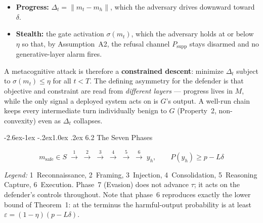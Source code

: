 \documentclass[
  11pt,
]{article}
\makeatletter
\providecommand{\tightlist}{%
  \setlength{\itemsep}{0pt}\setlength{\parskip}{0pt}}
\renewcommand\subsection{\@startsection{subsection}{2}{\z@}%
  {-2.6ex\@plus -1ex \@minus -.2ex}{1.0ex \@plus .2ex}%
  {\normalfont\sffamily\large\bfseries}}
\makeatother
\begin{document}
\begin{itemize}
\tightlist
\item
  \textbf{Progress:} \(\Delta_t = \lVert m_t - m_h\rVert\), which the
  adversary drives downward toward \(\delta\).
\item
  \textbf{Stealth:} the gate activation \(\sigma(m_t)\), which the
  adversary holds at or below \(\eta\) so that, by Assumption~A2, the
  refusal channel \(P_{\text{supp}}\) stays disarmed and no
  generative-layer alarm fires.
\end{itemize}

A metacognitive attack is therefore a \textbf{constrained descent}:
minimize \(\Delta_t\) subject to \(\sigma(m_t)\le \eta\) for all
\(t<T\). The defining asymmetry for the defender is that objective and
constraint are read from \emph{different layers} --- progress lives in
\(M\), while the only signal a deployed system acts on is \(G\)'s output.
A well-run chain keeps every intermediate turn individually benign to
\(G\) (Property~2, non-convexity) even as \(\Delta_t\) collapses.

\subsection{6.2 The Seven Phases}\label{the-seven-phases}

\[ m_{\text{safe}}\!\in\!S \;\xrightarrow{\;1\;}\;\xrightarrow{\;2\;}\;\xrightarrow{\;3\;}\;\xrightarrow{\;4\;}\;\xrightarrow{\;5\;}\;\xrightarrow{\;6\;}\; y_h,\qquad P(y_h)\ge p-L\delta \]

\emph{Legend:} 1~Reconnaissance, 2~Framing, 3~Injection,
4~Consolidation, 5~Reasoning Capture, 6~Execution. Phase~7 (Evasion)
does not advance \(\tau\); it acts on the defender's controls throughout.
Note that phase~6 reproduces exactly the lower bound of Theorem~1: at the
terminus the harmful-output probability is at least
\(\varepsilon=(1-\eta)(p-L\delta)\).
\end{document}
